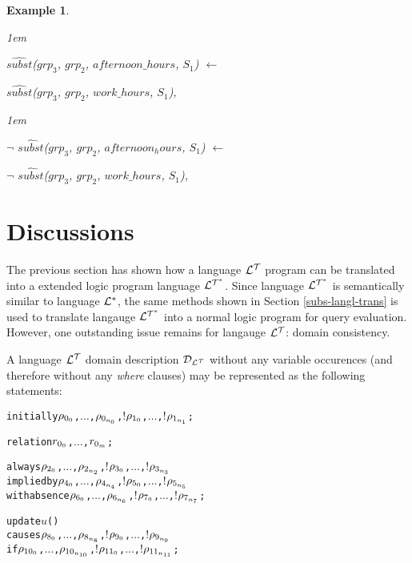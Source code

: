 \documentclass[11pt]{report}
\newtheorem{vexample}{Example}[chapter]
\newenvironment{vverbatim}
{
  \begin{alltt}
}
{
    \vspace{-\baselineskip}
  \end{alltt}
}
\newenvironment{vquote}
{
  \begin{list}{}{\leftmargin 1em}\item[]
}
{
  \end{list}
}
\begin{document}
\begin{vexample}
\begin{enumerate}
              \begin{vquote}
                $\hat{subst}$($grp_3$, $grp_2$, $afternoon\_hours$, $S_1$) $\leftarrow$

                \hspace{1em}
                $\hat{subst}$($grp_3$, $grp_2$, $work\_hours$, $S_1$),
              \end{vquote}

              \begin{vquote}
                $\lnot$ $\hat{subst}$($grp_3$, $grp_2$, $afternoon_hours$, $S_1$) $\leftarrow$

                \hspace{1em}
                $\lnot$ $\hat{subst}$($grp_3$, $grp_2$, $work\_hours$, $S_1$),
              \end{vquote}
          \end{enumerate}
        \end{vexample}

    \section{Discussions}
      \label{sect-tempo-discu}

      The previous section has shown how a language ${\cal L^T}$ program can
      be translated into a extended logic program language ${\cal L^{T^*}}$.
      Since language ${\cal L^{T^*}}$ is semantically similar to language
      ${\cal L^*}$, the same methods shown in Section \ref{subs-langl-trans} is
      used to translate langauge ${\cal L^{T^*}}$ into a normal logic program
      for query evaluation. However, one outstanding issue remains for langauge
      ${\cal L^T}$: domain consistency.

      A language ${\cal L^T}$ domain description ${\cal D}_{\cal L^T}$ without
      any variable occurences (and therefore without any {\em where} clauses)
      may be represented as the following statements:

      \begin{vverbatim}
  initially \(\rho\sb{0\sb{0}}\), \(\ldots\), \(\rho\sb{0\sb{n\sb{0}}}\), \(!\)\(\rho\sb{1\sb{0}}\), \(\ldots\), \(!\)\(\rho\sb{1\sb{n\sb{1}}}\);

  relation \(r\sb{0\sb{0}}\), \(\ldots\), \(r\sb{0\sb{m}}\);

  always \(\rho\sb{2\sb{0}}\), \(\ldots\), \(\rho\sb{2\sb{n\sb{2}}}\), \(!\)\(\rho\sb{3\sb{0}}\), \(\ldots\), \(!\)\(\rho\sb{3\sb{n\sb{3}}}\)
    implied by \(\rho\sb{4\sb{0}}\), \(\ldots\), \(\rho\sb{4\sb{n\sb{4}}}\), \(!\)\(\rho\sb{5\sb{0}}\), \(\ldots\), \(!\)\(\rho\sb{5\sb{n\sb{5}}}\)
    with absence \(\rho\sb{6\sb{0}}\), \(\ldots\), \(\rho\sb{6\sb{n\sb{6}}}\), \(!\)\(\rho\sb{7\sb{0}}\), \(\ldots\), \(!\)\(\rho\sb{7\sb{n\sb{7}}}\);

  update \(u\)()
    causes \(\rho\sb{8\sb{0}}\), \(\ldots\), \(\rho\sb{8\sb{n\sb{8}}}\), \(!\)\(\rho\sb{9\sb{0}}\), \(\ldots\), \(!\)\(\rho\sb{9\sb{n\sb{9}}}\)
    if \(\rho\sb{10\sb{0}}\), \(\ldots\), \(\rho\sb{10\sb{n\sb{10}}}\), \(!\)\(\rho\sb{11\sb{0}}\), \(\ldots\), \(!\)\(\rho\sb{11\sb{n\sb{11}}}\);
      \end{vverbatim}
\end{document}
